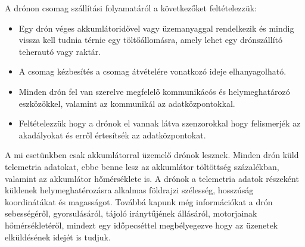 A drónon csomag szállítási folyamatáról a következőket feltételezzük:
\begin{itemize}
    \item Egy drón  véges akkumlátoridővel vagy üzemanyaggal rendelkezik és mindig vissza kell tudnia térnie egy töltőállomásra, amely lehet egy drónszállító teherautó vagy raktár.
    \item A csomag kézbesítés a csomag átvételére vonatkozó ideje elhanyagolható.
    \item Minden drón fel van szerelve megfelelő kommunikácós és helymeghatározó eszközökkel, valamint az kommunikál az adatközpontokkal.
    \item Feltételezzük hogy a drónok el vannak látva szenzorokkal hogy felismerjék az akadályokat és erről értesítsék az adatközpontokat.
\end{itemize}
A mi esetünkben csak akkumlátorral üzemelő drónok lesznek. Minden drón küld telemetria adatokat,
ebbe benne lesz az akkumlátor töltöttség százalékban, valamint az akkumlátor hőmérséklete is.
A drónok a telemetria adatok részeként küldenek helymeghatérozásra alkalmas
földrajzi szélesség, hosszúság koordinátákat és magasságot.
Továbbá kapunk még információkat a drón sebességéről,
gyorsulásáról, tájoló iránytűjének állásáról, motorjainak hőmérsékletéről,
mindezt egy időpecséttel megbélyegezve hogy az üzenetek elküldésének idejét is tudjuk.




